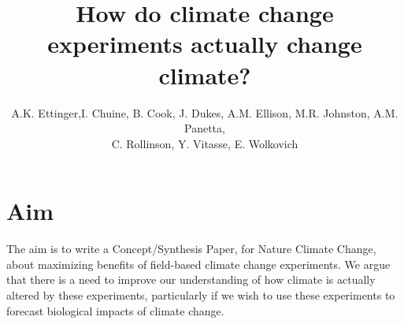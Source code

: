 \documentclass{article}
\begin{document}
 
\title{How do climate change experiments actually change climate?} %
\author{A.K. Ettinger,I. Chuine, B. Cook, J. Dukes, A.M. Ellison, M.R. Johnston, A.M. Panetta,\\ C. Rollinson, Y. Vitasse, E. Wolkovich}
\maketitle  %

\section* {Aim}

The aim is to write a Concept/Synthesis Paper, for Nature Climate Change, about maximizing benefits of field-based climate change experiments. We argue that there is a need to improve our understanding of how climate is actually altered by these experiments, particularly if we wish to use these experiments to forecast biological impacts of climate change. %
\end{document}
